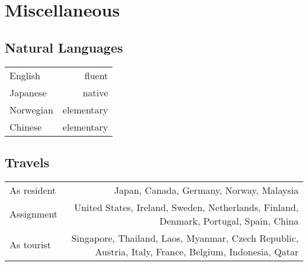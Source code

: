 \section*{Miscellaneous}
\subsection*{Natural Languages}
\begin{tabular}{L!{\VRule}R}  
English & fluent \\
Japanese & native \\
Norwegian & elementary \\
Chinese & elementary \\
\end{tabular}

\subsection*{Travels}
\begin{tabular}{L!{\VRule}R}  
As resident & Japan, Canada, Germany, Norway, Malaysia \\
Assignment & United States, Ireland, Sweden, Netherlands, Finland, Denmark, Portugal, Spain, China \\
As tourist & Singapore, Thailand, Laos, Myanmar, Czech Republic, Austria, Italy, France, Belgium, Indonesia, Qatar\\
\end{tabular}